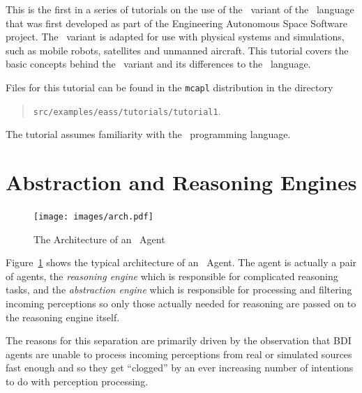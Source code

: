 \label{tutorial:eass:basic}
This is the first in a series of tutorials on the use of the \eass\ variant of the \gwendolen\ language that was first developed as part of the Engineering Autonomous Space Software project.  The \eass\ variant is adapted for use with physical systems and simulations, such as mobile robots, satellites and unmanned aircraft.  This tutorial covers the basic concepts behind the \eass\ variant and its differences to the \gwendolen\ language.  

Files for this tutorial can be found in the \texttt{mcapl} distribution in the directory 
\begin{quote}
\texttt{src/examples/eass/tutorials/tutorial1}.
\end{quote}

The tutorial assumes familiarity with the \gwendolen\ programming language.

\section{Abstraction and Reasoning Engines}

\begin{figure}[htb]
\begin{center}
\texttt{[image: images/arch.pdf]}
\end{center}
\caption{The Architecture of an \eass\ Agent}
\label{fig:arch}
\end{figure}
Figure~\ref{fig:arch} shows the typical architecture of an \eass\ Agent.  The agent is actually a pair of agents, the \emph{reasoning engine} which is responsible for complicated reasoning tasks, and the \emph{abstraction engine} which is responsible for processing and filtering incoming perceptions so only those actually needed for reasoning are passed on to the reasoning engine itself.

The reasons for this separation are primarily driven by the observation that BDI agents are unable to process incoming perceptions from real or simulated sources fast enough and so they get ``clogged'' by an ever increasing number of intentions to do with perception processing.  

